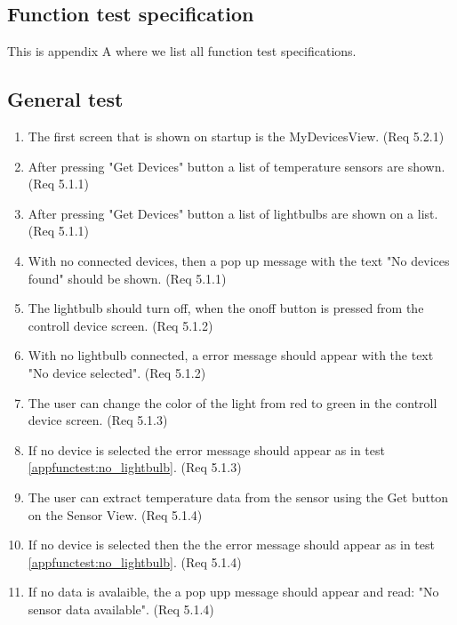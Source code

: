 \documentclass[a4paper]{article}
\begin{document}
\newpage
\begin{appendices}

\section{Function test specification} \label{appendix:section:functiontest}
This is appendix A where we list all function test specifications.

\subsection{General test}
%
%
\begin{enumerate}[label=\bfseries Test \thesubsection.\arabic*,labelwidth=\widthof{\text{Test 10.10.10}},leftmargin=!]
	\item The first screen that is shown on startup is the MyDevicesView. (Req 5.2.1)
	\item After pressing "Get Devices" button a list of temperature sensors are shown. (Req 5.1.1)
	\item After pressing  "Get Devices" button a list of lightbulbs are shown on a list. (Req 5.1.1)
    \item With no connected devices, then a pop up message with the text "No devices found" should be shown. (Req 5.1.1)
	\item The lightbulb should turn off, when the onoff button is pressed from the controll device screen. (Req 5.1.2)
    \item With no lightbulb connected, a error message should appear with the text "No device selected". (Req 5.1.2) \label{appfunctest:no_lightbulb}
    \item The user can change the color of the light from red to green in the controll device screen. (Req 5.1.3)
    \item If no device is selected the error message should appear as in test \ref{appfunctest:no_lightbulb}. (Req 5.1.3)
    \item The user can extract temperature data from the sensor using the Get button on the Sensor View. (Req 5.1.4)
    \item If no device is selected then the the error message should appear as in test \ref{appfunctest:no_lightbulb}. (Req 5.1.4)
    \item If no data is avalaible, the a pop upp message should appear and read: "No sensor data available". (Req 5.1.4)
\end{enumerate}


\end{appendices}
\end{document}
